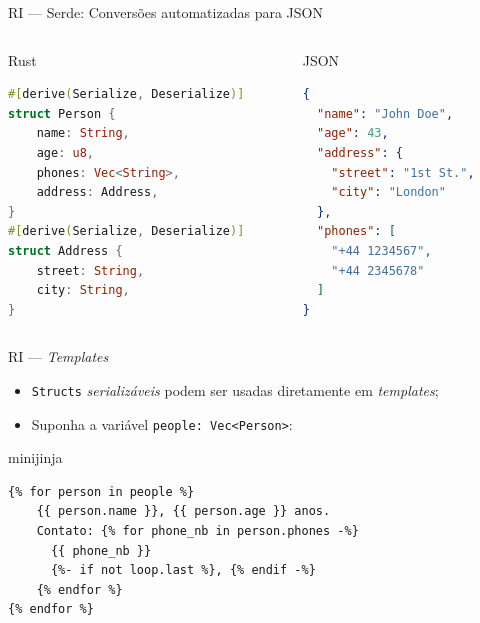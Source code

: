 \begin{frame}[fragile]{RI — Serde: Conversões automatizadas para JSON}
    \begin{columns}
        \begin{column}{.55\textwidth}
            \begin{block}{Rust}
                \begin{lstlisting}[language=Rust]
#[derive(Serialize, Deserialize)]
struct Person {
    name: String,
    age: u8,
    phones: Vec<String>,
    address: Address,
}
#[derive(Serialize, Deserialize)]
struct Address {
    street: String,
    city: String,
}
                \end{lstlisting}
            \end{block}
        \end{column}

        \begin{column}{.45\textwidth}
            \begin{block}{JSON}
                \begin{lstlisting}[language=json, tabsize=2]
{
  "name": "John Doe",
  "age": 43,
  "address": {
    "street": "1st St.",
    "city": "London"
  },
  "phones": [
    "+44 1234567",
    "+44 2345678"
  ]
}
                \end{lstlisting}
            \end{block}
        \end{column}
    \end{columns}
\end{frame}

\begin{frame}[fragile]{RI — \textit{Templates}}

    \begin{itemize}
        \item \texttt{Structs} \textit{serializáveis} podem ser usadas diretamente em \textit{templates};
        \item Suponha a variável \texttt{people: Vec<Person>}:
    \end{itemize}

    \begin{block}{minijinja}
        \begin{lstlisting}[language=jinja2]
{% for person in people %}
    {{ person.name }}, {{ person.age }} anos.
    Contato: {% for phone_nb in person.phones -%}
      {{ phone_nb }}
      {%- if not loop.last %}, {% endif -%}
    {% endfor %}
{% endfor %}
        \end{lstlisting}
    \end{block}
\end{frame}

